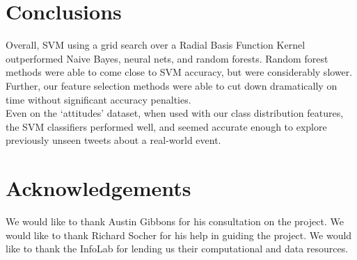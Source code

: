 \documentclass[fontsize=10pt,twocolumn,letterpaper,abstracton]{scrartcl}
\begin{document}
\begin{center}
\end{center}

\section{Conclusions}
Overall, SVM using a grid search over a Radial Basis Function Kernel outperformed Naive Bayes, neural nets, and random forests.  Random forest methods were able to come close to SVM accuracy, but were considerably slower.  Further, our feature selection methods were able to cut down dramatically on time without significant accuracy penalties.  \\
Even on the `attitudes' dataset, when used with our class distribution features, the SVM classifiers performed well, and seemed accurate enough to explore previously unseen tweets about a real-world event.

\section{Acknowledgements}

We would like to thank Austin Gibbons for his consultation on the project. We would like to thank Richard
Socher for his help in guiding the project. We would like to thank the InfoLab for lending us their computational and data resources.
\end{document}

